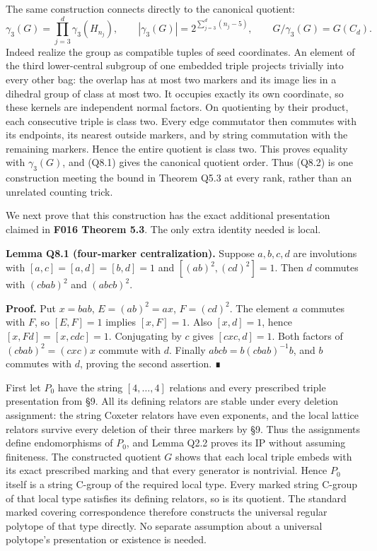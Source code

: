 \documentclass[
  10pt,
  letterpaper,
]{article}
\begin{document}
The same construction connects directly to the canonical quotient: \[
 \gamma_3(G)=\prod_{j=3}^d\gamma_3(H_{n_j}),\qquad
 |\gamma_3(G)|=2^{\sum_{j=3}^d(n_j-5)},\qquad
 G/\gamma_3(G)=G(C_d).                                  \tag{Q8.2}
\] Indeed realize the group as compatible tuples of seed coordinates. An
element of the third lower-central subgroup of one embedded triple
projects trivially into every other bag: the overlap has at most two
markers and its image lies in a dihedral group of class at most two. It
occupies exactly its own coordinate, so these kernels are independent
normal factors. On quotienting by their product, each consecutive triple
is class two. Every edge commutator then commutes with its endpoints,
its nearest outside markers, and by string commutation with the
remaining markers. Hence the entire quotient is class two. This proves
equality with \(\gamma_3(G)\), and (Q8.1) gives the canonical quotient
order. Thus (Q8.2) is one construction meeting the bound in Theorem Q5.3
at every rank, rather than an unrelated counting trick.

We next prove that this construction has the exact additional
presentation claimed in \textbf{F016 Theorem 5.3}. The only extra
identity needed is local.

\textbf{Lemma Q8.1 (four-marker centralization).} Suppose \(a,b,c,d\)
are involutions with \([a,c]=[a,d]=[b,d]=1\) and \([ (ab)^2,(cd)^2]=1\).
Then \(d\) commutes with \((cbab)^2\) and \((abcb)^2\).

\textbf{Proof.} Put \(x=bab\), \(E=(ab)^2=ax\), \(F=(cd)^2\). The
element \(a\) commutes with \(F\), so \([E,F]=1\) implies \([x,F]=1\).
Also \([x,d]=1\), hence \([x,Fd]=[x,cdc]=1\). Conjugating by \(c\) gives
\([cxc,d]=1\). Both factors of \((cbab)^2=(cxc)x\) commute with \(d\).
Finally \(abcb=b(cbab)^{-1}b\), and \(b\) commutes with \(d\), proving
the second assertion. ∎

First let \(P_0\) have the string \([4,\ldots,4]\) relations and every
prescribed triple presentation from §9. All its defining relators are
stable under every deletion assignment: the string Coxeter relators have
even exponents, and the local lattice relators survive every deletion of
their three markers by §9. Thus the assignments define endomorphisms of
\(P_0\), and Lemma Q2.2 proves its IP without assuming finiteness. The
constructed quotient \(G\) shows that each local triple embeds with its
exact prescribed marking and that every generator is nontrivial. Hence
\(P_0\) itself is a string C-group of the required local type. Every
marked string C-group of that local type satisfies its defining
relators, so is its quotient. The standard marked covering
correspondence therefore constructs the universal regular polytope of
that type directly. No separate assumption about a universal polytope's
presentation or existence is needed.
\end{document}
